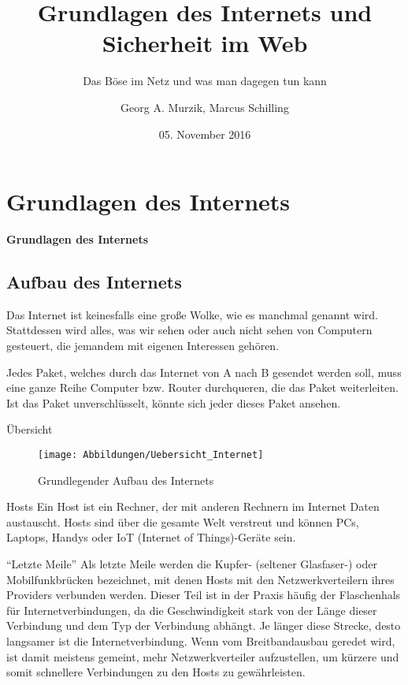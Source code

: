 \documentclass[utf8]{beamer}
\title{Grundlagen des Internets und Sicherheit im Web}
\subtitle{Das Böse im Netz und was man dagegen tun kann} %
\author{Georg A. Murzik, Marcus Schilling}
\institute{Terminal.21}
\date{05. November 2016}
\begin{document}
	
	\begin{frame}
		\titlepage
	\end{frame}
	
	\section{Grundlagen des Internets}
	\begin{frame}
		\centering \huge \textbf{Grundlagen des Internets}
	\end{frame}
	
	\subsection{Aufbau des Internets}
	\begin{frame}
		Das Internet ist keinesfalls eine große Wolke, wie es manchmal genannt wird. Stattdessen wird alles, was wir sehen oder auch nicht sehen von Computern gesteuert, die jemandem mit eigenen Interessen gehören.
		
		Jedes Paket, welches durch das Internet von A nach B gesendet werden soll, muss eine ganze Reihe Computer bzw. Router durchqueren, die das Paket weiterleiten. Ist das Paket unverschlüsselt, könnte sich jeder dieses Paket ansehen.
	\end{frame}
	
	\begin{frame}{Übersicht}
		\begin{figure}[H]
			\texttt{[image: Abbildungen/Uebersicht\_Internet]}
			\label{fig:Übersicht des Internets}
			\caption{Grundlegender Aufbau des Internets}
		\end{figure}
	\end{frame}
	
	\begin{frame}{Hosts}
		Ein Host ist ein Rechner, der mit anderen Rechnern im Internet Daten austauscht. Hosts sind über die gesamte Welt verstreut und können PCs, Laptops, Handys oder IoT (Internet of Things)-Geräte sein.
	\end{frame}
	
	\begin{frame}{\enquote{Letzte Meile}}
		Als letzte Meile werden die Kupfer- (seltener Glasfaser-) oder Mobilfunkbrücken bezeichnet, mit denen Hosts mit den Netzwerkverteilern ihres Providers verbunden werden. Dieser Teil ist in der Praxis häufig der Flaschenhals für Internetverbindungen, da die Geschwindigkeit stark von der Länge dieser Verbindung und dem Typ der Verbindung abhängt. Je länger diese Strecke, desto langsamer ist die Internetverbindung.
		Wenn vom Breitbandausbau geredet wird, ist damit meistens gemeint, mehr Netzwerkverteiler aufzustellen, um kürzere und somit schnellere Verbindungen zu den Hosts zu gewährleisten.		
	\end{frame}
\end{document}
